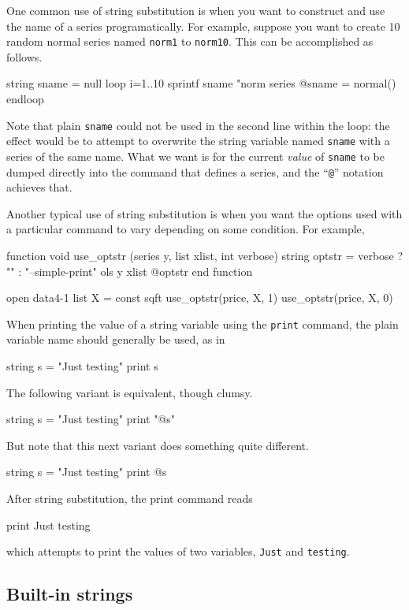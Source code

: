 One common use of string substitution is when you want to construct
and use the name of a series programatically. For example, suppose you
want to create 10 random normal series named \texttt{norm1} to
\texttt{norm10}. This can be accomplished as follows.
%
\begin{code}
string sname = null
loop i=1..10
  sprintf sname "norm%
  series @sname = normal()
endloop
\end{code}
%
Note that plain \texttt{sname} could not be used in the second line
within the loop: the effect would be to attempt to overwrite the
string variable named \texttt{sname} with a series of the same
name. What we want is for the current \textit{value} of
\texttt{sname} to be dumped directly into the command that defines a
series, and the ``\verb|@|'' notation achieves that.

Another typical use of string substitution is when you want the
options used with a particular command to vary depending on
some condition. For example,
%
\begin{code}
function void use_optstr (series y, list xlist, int verbose)
   string optstr = verbose ? "" : "--simple-print"
   ols y xlist @optstr 
end function

open data4-1
list X = const sqft
use_optstr(price, X, 1)
use_optstr(price, X, 0)
\end{code} 

When printing the value of a string variable using the \texttt{print}
command, the plain variable name should generally be used, as in
%
\begin{code}
string s = "Just testing"
print s
\end{code}
%
The following variant is equivalent, though clumsy.
%
\begin{code}
string s = "Just testing"
print "@s"
\end{code}
%
But note that this next variant does something quite different.
%
\begin{code}
string s = "Just testing"
print @s
\end{code}
%
After string substitution, the print command reads
%
\begin{code}
print Just testing
\end{code}
%
which attempts to print the values of two variables, \texttt{Just} and
\texttt{testing}.


\subsection{Built-in strings}

